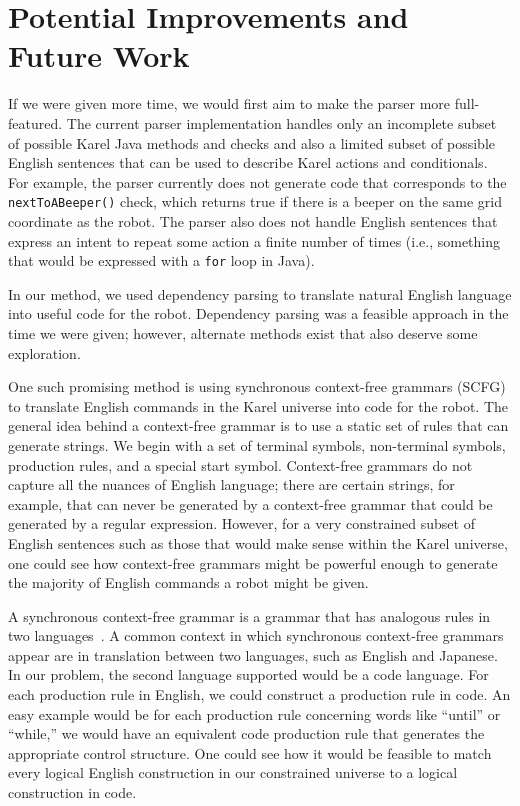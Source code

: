 \documentclass[11pt]{article}
\begin{document}
\section{Potential Improvements and Future Work}
If we were given more time, we would first aim to make the parser more full-featured. The current
parser implementation handles only an incomplete subset of possible Karel Java methods and checks
and also a limited subset of possible English sentences that can be used to describe Karel actions
and conditionals. For example, the parser currently does not generate code that corresponds to the
\texttt{nextToABeeper()} check, which returns true if there is a beeper on the same grid coordinate
as the robot. The parser also does not handle English sentences that express an intent to repeat
some action a finite number of times (i.e., something that would be expressed with a \texttt{for}
loop in Java).

In our method, we used dependency parsing to translate natural English language into useful code
for the robot.  Dependency parsing was a feasible approach in the time we were given; however,
alternate methods exist that also deserve some exploration.

One such promising method is using synchronous context-free grammars (SCFG) to translate English
commands in the Karel universe into code for the robot.  The general idea behind a context-free
grammar is to use a static set of rules that can generate strings.  We begin with a set of terminal
symbols, non-terminal symbols, production rules, and a special start symbol.  Context-free grammars
do not capture all the nuances of English language; there are certain strings, for example, that
can never be generated by a context-free grammar that could be generated by a regular expression.
However, for a very constrained subset of English sentences such as those that would make sense
within the Karel universe, one could see how context-free grammars might be powerful enough to
generate the majority of English commands a robot might be given.

A synchronous context-free grammar is a grammar that has analogous rules in two
languages~\cite{Chiang:2006aa}. A common context in which synchronous context-free grammars appear
are in translation between two languages, such as English and Japanese.  In our problem, the second
language supported would be a code language.  For each production rule in English, we could
construct a production rule in code. An easy example would be for each production rule concerning
words like ``until'' or ``while,'' we would have an equivalent code production rule that generates
the appropriate control structure. One could see how it would be feasible to match every logical
English construction in our constrained universe to a logical construction in code.
\end{document}
